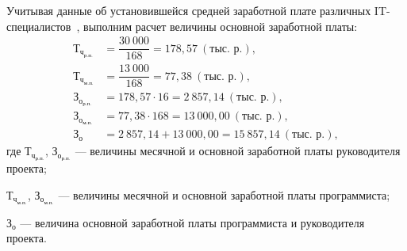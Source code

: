Учитывая данные об установившейся средней заработной
плате различных IT-специалистов~\cite{dev_by_salaries},
выполним расчет величины основной заработной платы:
\begin{equation}
  \label{eq:teo_salary}
  \begin{aligned}
    \text{Т}_{\text{ч}_{\text{р.п.}}}& = \dfrac{30 \: 000}{168} = 178{,}57 \: (\text{тыс. р.}), \\[1mm]
    \text{Т}_{\text{ч}_{\text{м.п.}}}& = \dfrac{13 \: 000}{168}  = 77{,}38 \: (\text{тыс. р.}), \\[1mm]
    \text{З}_{\text{о}_{\text{р.п.}}}& = 178{,}57 \cdot 16 = 2 \: 857{,}14 \: (\text{тыс. р.}), \\
    \text{З}_{\text{о}_{\text{м.п.}}}& = 77{,}38 \cdot 168 = 13 \: 000{,}00 \: (\text{тыс. р.}), \\
    \text{З}_{\text{о}}& = 2 \: 857{,}14 + 13 \: 000{,}00 = 15 \: 857{,}14 \: (\text{тыс. р.}),
  \end{aligned}
\end{equation}
\noindent где
\( \text{Т}_{\text{ч}_{\text{р.п.}}} \), \( \text{З}_{\text{о}_{\text{р.п.}}} \)
--- величины месячной и основной заработной платы руководителя проекта; \par
\noindent \hspace{6.2mm} \( \text{Т}_{\text{ч}_{\text{м.п.}}} \), \( \text{З}_{\text{о}_{\text{м.п.}}} \) --- величины месячной и основной заработной платы программиста; \par
\noindent \hspace{6.2mm} \( \text{З}_{\text{о}} \) --- величина основной
заработной платы программиста и руководителя проекта.

\pagebreak


